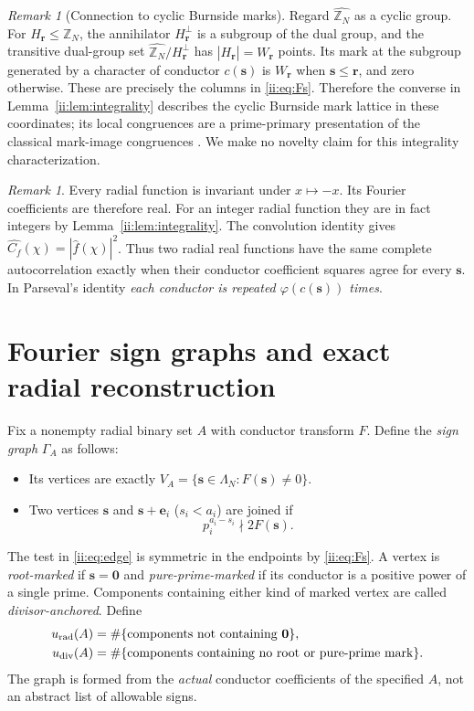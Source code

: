 \documentclass[11pt]{article}
\numberwithin{equation}{section}
\theoremstyle{definition}
\theoremstyle{remark}
\newtheorem{remark}[theorem]{Remark}
\newcommand{\s}{\boldsymbol{s}}
\newcommand{\rvec}{\boldsymbol{r}}
\newcommand{\e}{\boldsymbol{e}}
\begin{document}
\begin{remark}[Connection to cyclic Burnside marks]\label{ii:rem:burnside}
Regard $\widehat{\mathbb Z_N}$ as a cyclic group.  For $H_{\rvec}\le\mathbb Z_N$, the annihilator $H_{\rvec}^{\perp}$ is a subgroup of the dual group, and the transitive dual-group set $\widehat{\mathbb Z_N}/H_{\rvec}^{\perp}$ has $|H_{\rvec}|=W_{\rvec}$ points.  Its mark at the subgroup generated by a character of conductor $c(\s)$ is $W_{\rvec}$ when $\s\le\rvec$, and zero otherwise.  These are precisely the columns in \eqref{ii:eq:Fs}.  Therefore the converse in Lemma~\ref{ii:lem:integrality} describes the cyclic Burnside mark lattice in these coordinates; its local congruences are a prime-primary presentation of the classical mark-image congruences \cite{tomDieck1979,BoltjePfeiffer2008}.  We make no novelty claim for this integrality characterization.
\end{remark}

\begin{remark}\label{ii:rem:fourier}
Every radial function is invariant under $x\mapsto-x$.  Its Fourier coefficients are therefore real.  For an integer radial function they are in fact integers by Lemma~\ref{ii:lem:integrality}.  The convolution identity gives $\widehat{C_f}(\chi)=|\widehat f(\chi)|^2$.  Thus two radial real functions have the same complete autocorrelation exactly when their conductor coefficient squares agree for every $\s$.  In Parseval's identity \emph{each conductor is repeated $\varphi(c(\s))$ times}.
\end{remark}

\section{Fourier sign graphs and exact radial reconstruction}
Fix a nonempty radial binary set $A$ with conductor transform $F$.  Define the \emph{sign graph} $\Gamma_A$ as follows:
\begin{itemize}[nosep]
 \item Its vertices are exactly $V_A=\{\s\in\Lambda_N:F(\s)\ne0\}$.
 \item Two vertices $\s$ and $\s+\e_i$ ($s_i<a_i$) are joined if
 \begin{equation}\label{ii:eq:edge}
 p_i^{a_i-s_i}\nmid 2F(\s).
 \end{equation}
\end{itemize}
The test in \eqref{ii:eq:edge} is symmetric in the endpoints by \eqref{ii:eq:Fs}.  A vertex is \emph{root-marked} if $\s=\boldsymbol0$ and \emph{pure-prime-marked} if its conductor is a positive power of a single prime.  Components containing either kind of marked vertex are called \emph{divisor-anchored}.  Define
\begin{align*}
 u_{\rm rad}(A)&=\#\{\text{components not containing }\boldsymbol0\},\\
 u_{\rm div}(A)&=\#\{\text{components containing no root or pure-prime mark}\}.
\end{align*}
The graph is formed from the \emph{actual} conductor coefficients of the specified $A$, not an abstract list of allowable signs.
\end{document}
